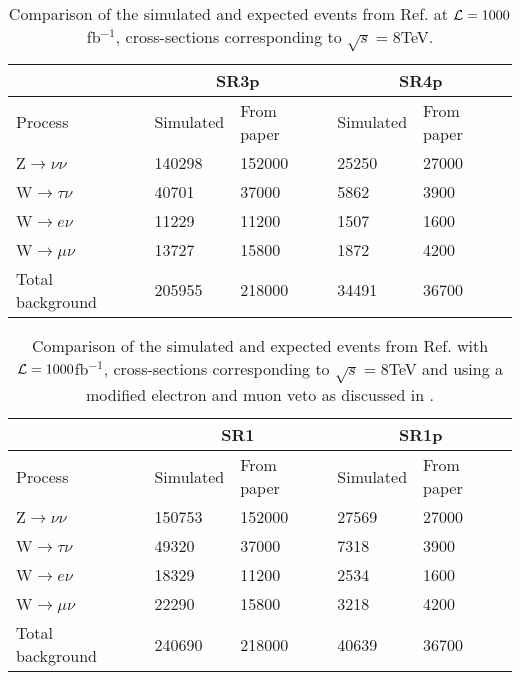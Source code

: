 \begin{table}[ht]
\begin{center}
\begin{tabular}{|l|l|l|l|l|}
\hline
& \multicolumn{2}{c}{SR3p} & \multicolumn{2}{|c|}{SR4p} \\
\hline
Process & Simulated & From paper & Simulated & From paper \\ \hline
Z$\rightarrow\nu\nu$ & 140298 & 152000 & 25250 & 27000 \\
W$\rightarrow\tau\nu$ & 40701 & 37000 & 5862 & 3900 \\
W$\rightarrow e\nu$ & 11229 & 11200 & 1507 & 1600 \\
W$\rightarrow\mu\nu$ & 13727 & 15800 & 1872 & 4200 \\ \hline
Total background & 205955 & 218000 & 34491 & 36700 \\ \hline
\end{tabular}
\caption{Comparison of the simulated and expected events from Ref. \citep{ATLAS-CONF-2012-147} at $\mathcal{L}=1000$fb$^{-1}$, cross-sections corresponding to $\sqrt{s}=8$TeV.}
\label{tab:Compare1}
\end{center}
\end{table}

\begin{table}[ht]
\begin{center}
\begin{tabular}{|l|l|l|l|l|}
\hline
& \multicolumn{2}{c}{SR1} & \multicolumn{2}{|c|}{SR1p} \\
\hline
Process & Simulated  & From paper & Simulated & From paper  \\ \hline
Z$\rightarrow\nu\nu$ & 150753 & 152000 & 27569 & 27000 \\
W$\rightarrow\tau\nu$ & 49320 & 37000 & 7318 & 3900 \\
W$\rightarrow e\nu$ & 18329 & 11200 & 2534 & 1600 \\
W$\rightarrow\mu\nu$ & 22290 & 15800 & 3218 & 4200 \\ \hline
Total background & 240690 & 218000 & 40639 & 36700 \\ \hline
\end{tabular}
\caption{Comparison of the simulated and expected events from Ref. \citep{ATLAS-CONF-2012-147} with $\mathcal{L}=1000$fb$^{-1}$, cross-sections corresponding to $\sqrt{s}=8$TeV and using a modified electron and muon veto as discussed in .}
\label{tab:newcomp}
\end{center}
\end{table}


